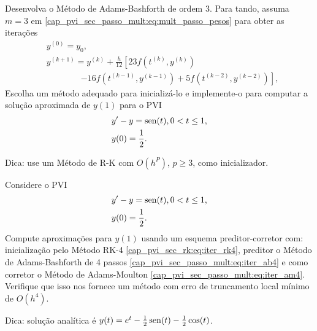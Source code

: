 \begin{exer}
  Desenvolva o Método de Adams-Bashforth de ordem 3. Para tando, assuma $m=3$ em \eqref{cap_pvi_sec_passo_mult:eq:mult_passo_pesos} para obter as iterações
  \begin{equation}
    \begin{aligned}
      &y^{(0)} = y_0,\\
      &y^{(k+1)} = y^{(k)} + \frac{h}{12}\left[23f(t^{(k)},y^{(k)}) \right.\\
      &\qquad\qquad\left. - 16f(t^{(k-1)},y^{(k-1)}) + 5f(t^{(k-2)},y^{(k-2)})\right],
    \end{aligned}
  \end{equation}
  Escolha um método adequado para inicializá-lo e implemente-o para computar a solução aproximada de $y(1)$ para o PVI
  \begin{subequations}
    \begin{align}
      &y' - y = \operatorname{sen}(t), 0 < t \leq 1,\\
      &y(0) = \frac{1}{2}.
    \end{align}
  \end{subequations}
\end{exer}
\begin{resp}
  Dica: use um Método de R-K com $O(h^P)$, $p\geq 3$, como inicializador.
\end{resp}

\begin{exer}\label{cap_pvi_sec_passo_mult:exer:pca4}
  Considere o PVI
  \begin{subequations}
    \begin{align}
      &y' - y = \operatorname{sen}(t), 0 < t \leq 1,\\
      &y(0) = \frac{1}{2}.
    \end{align}
  \end{subequations}
  Compute aproximações para $y(1)$ usando um esquema preditor-corretor com: inicialização pelo Método RK-4 \ref{cap_pvi_sec_rk:eq:iter_rk4}, preditor o Método de Adams-Bashforth de 4 passos \eqref{cap_pvi_sec_passo_mult:eq:iter_ab4} e como corretor o Método de Adams-Moulton \eqref{cap_pvi_sec_passo_mult:eq:iter_am4}. Verifique que isso nos fornece um método com erro de truncamento local mínimo de $O(h^4)$.
\end{exer}
\begin{resp}
  Dica: solução analítica é $y(t) = e^t - \frac{1}{2}\operatorname{sen}(t) - \frac{1}{2}\cos(t)$.
\end{resp}

